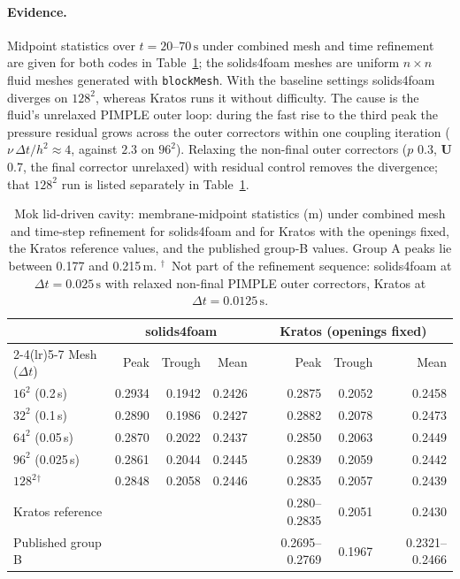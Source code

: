 \paragraph{Evidence.}
Midpoint statistics over $t = 20$--$70\,\mathrm{s}$ under combined mesh and time refinement are given for both codes in Table~\ref{tab:mok}; the solids4foam meshes are uniform $n\times n$ fluid meshes generated with \texttt{blockMesh}. With the baseline settings solids4foam diverges on $128^2$, whereas Kratos runs it without difficulty. The cause is the fluid's unrelaxed PIMPLE outer loop: during the fast rise to the third peak the pressure residual grows across the outer correctors within one coupling iteration ($\nu\,\Delta t/h^2 \approx 4$, against $2.3$ on $96^2$). Relaxing the non-final outer correctors ($p$ 0.3, $\mathbf{U}$ 0.7, the final corrector unrelaxed) with residual control removes the divergence; that $128^2$ run is listed separately in Table~\ref{tab:mok}.

\begin{table}[htbp]
	\centering
	\small
	\setlength{\tabcolsep}{5pt}
	\caption{Mok lid-driven cavity: membrane-midpoint statistics (m) under combined mesh and time-step refinement for solids4foam and for Kratos with the openings fixed, the Kratos reference values, and the published group-B values. Group A peaks lie between 0.177 and 0.215\,m. $^\dagger$~Not part of the refinement sequence: solids4foam at $\Delta t = 0.025\,\mathrm{s}$ with relaxed non-final PIMPLE outer correctors, Kratos at $\Delta t = 0.0125\,\mathrm{s}$.}
	\label{tab:mok}
	\begin{tabular}{lrrrrrr}
		\toprule
		& \multicolumn{3}{c}{solids4foam} & \multicolumn{3}{c}{Kratos (openings fixed)} \\
		\cmidrule(lr){2-4}\cmidrule(lr){5-7}
		Mesh ($\Delta t$) & Peak & Trough & Mean & Peak & Trough & Mean \\
		\midrule
		$16^2$ (0.2\,s) & 0.2934 & 0.1942 & 0.2426 & 0.2875 & 0.2052 & 0.2458 \\
		$32^2$ (0.1\,s) & 0.2890 & 0.1986 & 0.2427 & 0.2882 & 0.2078 & 0.2473 \\
		$64^2$ (0.05\,s) & 0.2870 & 0.2022 & 0.2437 & 0.2850 & 0.2063 & 0.2449 \\
		$96^2$ (0.025\,s) & 0.2861 & 0.2044 & 0.2445 & 0.2839 & 0.2059 & 0.2442 \\
		$128^2$$^\dagger$ & 0.2848 & 0.2058 & 0.2446 & 0.2835 & 0.2057 & 0.2439 \\
		\midrule
		Kratos reference & & & & 0.280--0.2835 & 0.2051 & 0.2430 \\
		Published group B & & & & 0.2695--0.2769 & 0.1967 & 0.2321--0.2466 \\
		\bottomrule
	\end{tabular}
\end{table}

